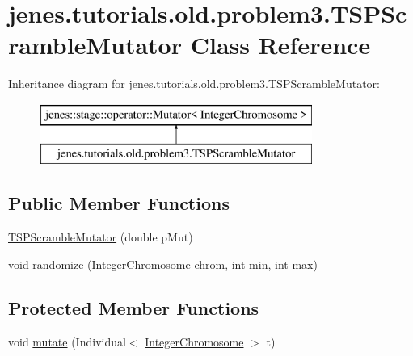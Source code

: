 \hypertarget{classjenes_1_1tutorials_1_1old_1_1problem3_1_1_t_s_p_scramble_mutator}{\section{jenes.\-tutorials.\-old.\-problem3.\-T\-S\-P\-Scramble\-Mutator Class Reference}
\label{classjenes_1_1tutorials_1_1old_1_1problem3_1_1_t_s_p_scramble_mutator}
}
Inheritance diagram for jenes.\-tutorials.\-old.\-problem3.\-T\-S\-P\-Scramble\-Mutator\-:\begin{figure}[H]
\begin{center}
\leavevmode
\includegraphics[height=2.000000cm]{classjenes_1_1tutorials_1_1old_1_1problem3_1_1_t_s_p_scramble_mutator}
\end{center}
\end{figure}
\subsection*{Public Member Functions}
\begin{DoxyCompactItemize}
\item 
\hyperlink{classjenes_1_1tutorials_1_1old_1_1problem3_1_1_t_s_p_scramble_mutator_aca9301f7d3b4b7d7f27e52f462734f49}{T\-S\-P\-Scramble\-Mutator} (double p\-Mut)
\item 
void \hyperlink{classjenes_1_1tutorials_1_1old_1_1problem3_1_1_t_s_p_scramble_mutator_aa32403f391bb9ddffb1145b4d852187d}{randomize} (\hyperlink{classjenes_1_1chromosome_1_1_integer_chromosome}{Integer\-Chromosome} chrom, int min, int max)
\end{DoxyCompactItemize}
\subsection*{Protected Member Functions}
\begin{DoxyCompactItemize}
\item 
void \hyperlink{classjenes_1_1tutorials_1_1old_1_1problem3_1_1_t_s_p_scramble_mutator_a7c2d7c9d8b465b19e0c4f8da57e299f3}{mutate} (Individual$<$ \hyperlink{classjenes_1_1chromosome_1_1_integer_chromosome}{Integer\-Chromosome} $>$ t)
\end{DoxyCompactItemize}


